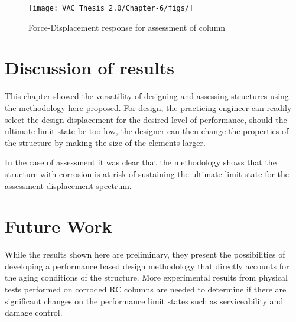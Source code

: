 \begin{figure}[htbp]
	\centering
	\texttt{[image: VAC Thesis 2.0/Chapter-6/figs/]}
	\caption{Force-Displacement response for assessment of column}
	\label{fig:force_displacement_assessment}
\end{figure}

\section{Discussion of results}

This chapter showed the versatility of designing and assessing structures using the methodology here proposed. For design, the practicing engineer can readily select the design displacement for the desired level of performance, should the ultimate limit state be too low, the designer can then change the properties of the structure by making the size of the elements larger. 

In the case of assessment it was clear that the methodology shows that the structure with corrosion is at risk of sustaining the ultimate limit state for the assessment displacement spectrum.

\section{Future Work}

While the results shown here are preliminary, they present the possibilities of developing a performance based design methodology that directly accounts for the aging conditions of the structure. More experimental results from physical tests performed on corroded RC columns are needed to determine if there are significant changes on the performance limit states such as serviceability and damage control.